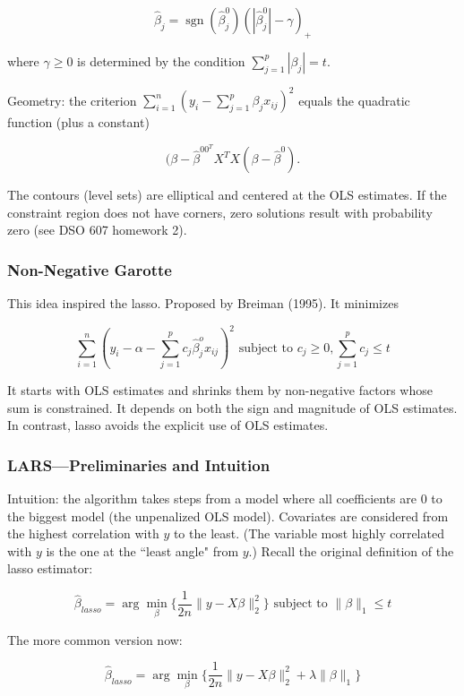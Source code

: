 \[
\hat{\beta}_j = \operatorname{sgn}(\hat{\beta}_j^0) (| \hat{\beta}_j^0| - \gamma)_+
\]

where \(\gamma \geq 0\) is determined by the condition \(\sum_{j=1}^p |\beta_j| = t\).

Geometry: the criterion \(\sum_{i=1}^n (y_i - \sum_{j=1}^p \beta_j x_{ij})^2\) equals the quadratic function (plus a constant)

\[
(\beta - \hat{\beta}^00^TX^T X(\beta - \hat{\beta}^0).
\]

The contours (level sets) are elliptical and centered at the OLS estimates. If the constraint region does not have corners, zero solutions result with probability zero (see DSO 607 homework 2).

\subsubsection{Non-Negative Garotte}

This idea inspired the lasso. Proposed by Breiman (1995). It minimizes

\[
\sum_{i=1}^n (y_i - \alpha - \sum_{j=1}^p c_j \hat{\beta}_j^o x_{ij})^2 \text{ subject to } c_j \geq 0, \sum_{j=1}^p c_j \leq t
\]

It starts with OLS estimates and shrinks them by non-negative factors whose sum is constrained. It depends on both the sign and magnitude of OLS estimates. In contrast, lasso avoids the explicit use of OLS estimates.

\subsubsection{LARS---Preliminaries and Intuition}

Intuition: the algorithm takes steps from a model where all coefficients are 0 to the biggest model (the unpenalized OLS model). Covariates are considered from the highest correlation with \(y\) to the least. (The variable most highly correlated with \(y\) is the one at the ``least angle" from \(y\).) Recall the original definition of the lasso estimator:

\begin{equation}\label{linreg.lasso.constrained}
\hat{\beta}_{lasso} = \arg \min_\beta \{ \frac{1}{2n}\lVert y - X \beta \rVert_2^2 \} \text{ subject to } \lVert \beta \rVert_1 \leq t
\end{equation}

The more common version now:

\begin{equation}\label{linreg.lasso.lagrangian}
\hat{\beta}_{lasso} = \arg \min_\beta \{ \frac{1}{2n}\lVert y - X \beta \rVert_2^2   + \lambda \lVert \beta \rVert_1\}
\end{equation}

